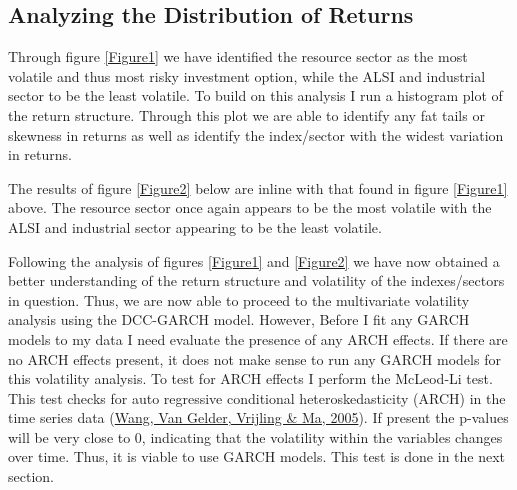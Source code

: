\documentclass[12pt,preprint, authoryear]{elsarticle}
\numberwithin{equation}{section}
\numberwithin{figure}{section}
\numberwithin{table}{section}
\begin{document}
\hypertarget{analyzing-the-distribution-of-returns}{%
\subsection{Analyzing the Distribution of
Returns}\label{analyzing-the-distribution-of-returns}}

Through figure \ref{Figure1} we have identified the resource sector as
the most volatile and thus most risky investment option, while the ALSI
and industrial sector to be the least volatile. To build on this
analysis I run a histogram plot of the return structure. Through this
plot we are able to identify any fat tails or skewness in returns as
well as identify the index/sector with the widest variation in returns.

The results of figure \ref{Figure2} below are inline with that found in
figure \ref{Figure1} above. The resource sector once again appears to be
the most volatile with the ALSI and industrial sector appearing to be
the least volatile.

Following the analysis of figures \ref{Figure1} and \ref{Figure2} we
have now obtained a better understanding of the return structure and
volatility of the indexes/sectors in question. Thus, we are now able to
proceed to the multivariate volatility analysis using the DCC-GARCH
model. However, Before I fit any GARCH models to my data I need evaluate
the presence of any ARCH effects. If there are no ARCH effects present,
it does not make sense to run any GARCH models for this volatility
analysis. To test for ARCH effects I perform the McLeod-Li test. This
test checks for auto regressive conditional heteroskedasticity (ARCH) in
the time series data (\protect\hyperlink{ref-wang2005testing}{Wang, Van
Gelder, Vrijling \& Ma, 2005}). If present the p-values will be very
close to 0, indicating that the volatility within the variables changes
over time. Thus, it is viable to use GARCH models. This test is done in
the next section.
\end{document}
